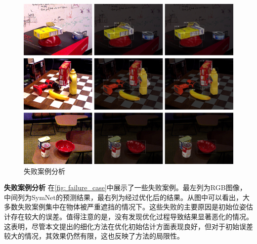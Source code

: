 \begin{figure}[htbp]
    \centerline{\includegraphics[width=1.0\textwidth]{figure/ca/failure_case.jpg}}
        \caption{失败案例分析}
        \label{fig: failure_case}
\end{figure}

\textbf{失败案例分析 } 在\autoref{fig: failure_case}中展示了一些失败案例。最左列为RGB图像，中间列为SymNet的预测结果，最右列为经过优化后的结果。从图中可以看出，大多数失败案例集中在物体被严重遮挡的情况下。这些失败的主要原因是初始位姿估计存在较大的误差。值得注意的是，没有发现优化过程导致结果显著恶化的情况。这表明，尽管本文提出的细化方法在优化初始估计方面表现良好，但对于初始误差较大的情况，其效果仍然有限，这也反映了方法的局限性。